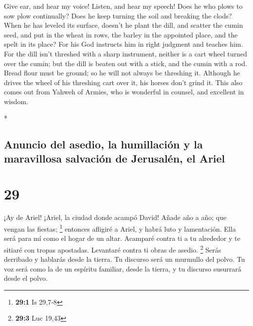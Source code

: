 \begin{paracol}{2}
\begin{otherlanguage}{english}
 Give ear, and hear my voice! Listen, and hear my speech!
 Does he who plows to sow plow continually? Does he keep
turning the soil and breaking the clods?  When he has
leveled its surface, doesn't he plant the dill, and scatter the cumin
seed, and put in the wheat in rows, the barley in the appointed place,
and the spelt in its place?  For his God instructs him in
right judgment and teaches him.  For the dill isn't
threshed with a sharp instrument, neither is a cart wheel turned over
the cumin; but the dill is beaten out with a stick, and the cumin with a
rod.  Bread flour must be ground; so he will not always
be threshing it. Although he drives the wheel of his threshing cart over
it, his horses don't grind it.  This also comes out from
Yahweh of Armies, who is wonderful in counsel, and excellent in wisdom.

\end{otherlanguage}

\switchcolumn[0]*

\hypertarget{anuncio-del-asedio-la-humillaciuxf3n-y-la-maravillosa-salvaciuxf3n-de-jerusaluxe9n-el-ariel}{%
\subsection{Anuncio del asedio, la humillación y la maravillosa
salvación de Jerusalén, el
Ariel}\label{anuncio-del-asedio-la-humillaciuxf3n-y-la-maravillosa-salvaciuxf3n-de-jerusaluxe9n-el-ariel}}

\hypertarget{section-56}{%
\section{29}\label{section-56}}

 ¡Ay de Ariel! ¡Ariel, la ciudad donde acampó David! Añade
año a año; que vengan las fiestas; \footnote{\textbf{29:1} Is 29,7-8}
 entonces afligiré a Ariel, y habrá luto y lamentación.
Ella será para mí como el hogar de un altar.  Acamparé
contra ti a tu alrededor y te sitiaré con tropas apostadas. Levantaré
contra ti obras de asedio. \footnote{\textbf{29:3} Luc 19,43}
 Serás derribado y hablarás desde la tierra. Tu discurso
será un murmullo del polvo. Tu voz será como la de un espíritu familiar,
desde la tierra, y tu discurso susurrará desde el polvo.


\end{paracol}

